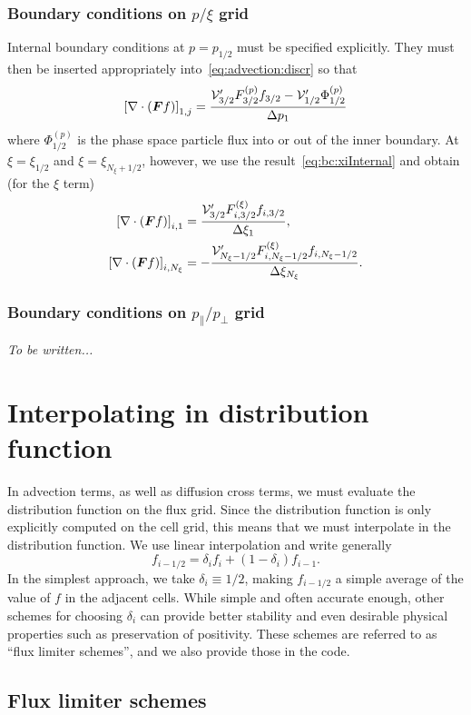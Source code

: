 \documentclass{notes}
\newcommand{\Vp}{\mathcal{V}'}
\begin{document}
    \subsubsection{Boundary conditions on $p/\xi$ grid}
    Internal boundary conditions at $p=p_{1/2}$ must be specified explicitly.
    They must then be inserted appropriately into~\eqref{eq:advection:discr} so
    that
    \begin{equation}
        \left[ \nabla\cdot\left( \bb{F}f \right) \right]_{1,j} = \frac{
            \Vp_{3/2} F_{3/2}^{(p)} f_{3/2} - \Vp_{1/2}\Phi^{(p)}_{1/2}
        }{\Delta p_{1}}
    \end{equation}
    where $\Phi_{1/2}^{(p)}$ is the phase space particle flux into or out of
    the inner boundary. At $\xi=\xi_{1/2}$ and $\xi=\xi_{N_\xi+1/2}$, however,
    we use the result~\eqref{eq:bc:xiInternal} and obtain (for the $\xi$ term)
    \begin{equation}
        \begin{aligned}
            \left[ \nabla\cdot\left( \bb{F} f \right) \right]_{i,1} &=
                \frac{\Vp_{3/2} F^{(\xi)}_{i,3/2} f_{i,3/2}}{\Delta\xi_{1}},\\
            \left[ \nabla\cdot\left( \bb{F} f \right) \right]_{i,N_\xi} &=
                -\frac{\Vp_{N_\xi-1/2} F^{(\xi)}_{i,N_\xi-1/2} f_{i,N_\xi-1/2}}{\Delta\xi_{N_\xi}}.
        \end{aligned}
    \end{equation}

    \subsubsection{Boundary conditions on $p_\parallel / p_\perp$ grid}
    \emph{To be written...}

    \section{Interpolating in distribution function}\label{sec:interp}
    In advection terms, as well as diffusion cross terms, we must evaluate the
    distribution function on the flux grid. Since the distribution function is
    only explicitly computed on the cell grid, this means that we must
    interpolate in the distribution function. We use linear interpolation and
    write generally
    \begin{equation}
        f_{i-1/2} = \delta_{i} f_i + \left( 1 - \delta_i \right) f_{i-1}.
    \end{equation}
    In the simplest approach, we take $\delta_i\equiv 1/2$, making $f_{i-1/2}$
    a simple average of the value of $f$ in the adjacent cells. While simple and
    often accurate enough, other schemes for choosing $\delta_i$ can provide
    better stability and even desirable physical properties such as preservation
    of positivity. These schemes are referred to as ``flux limiter schemes'',
    and we also provide those in the code.

    \subsection{Flux limiter schemes}
\end{document}
